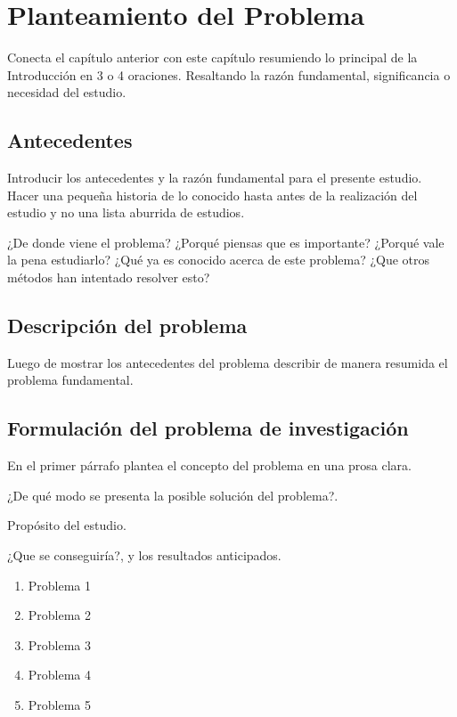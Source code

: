 \chapter{Planteamiento del Problema}
\thispagestyle{empty} %
Conecta el capítulo anterior con este capítulo resumiendo lo principal de la Introducción en 3 o 4 oraciones. Resaltando la razón fundamental, significancia o necesidad del estudio.

\section{Antecedentes}

Introducir los antecedentes y la razón fundamental para el presente estudio. Hacer una pequeña historia de lo conocido hasta antes de la realización del estudio y no una lista aburrida de estudios.

¿De donde viene el problema?
¿Porqué piensas que es importante?
¿Porqué vale la pena estudiarlo?
¿Qué ya es conocido acerca de este problema?
¿Que otros métodos han intentado resolver esto?

\section{Descripción del problema}

Luego de mostrar los antecedentes del problema describir de manera resumida el problema fundamental.

\section{Formulación del problema de investigación}

En el primer párrafo plantea el concepto del problema en una prosa clara.

¿De qué modo se presenta la posible solución del problema?.

Propósito del estudio.

¿Que se conseguiría?, y los resultados anticipados.

\begin{enumerate}
\item Problema 1
\item Problema 2
\item Problema 3
\item Problema 4
\item Problema 5
\end{enumerate}

